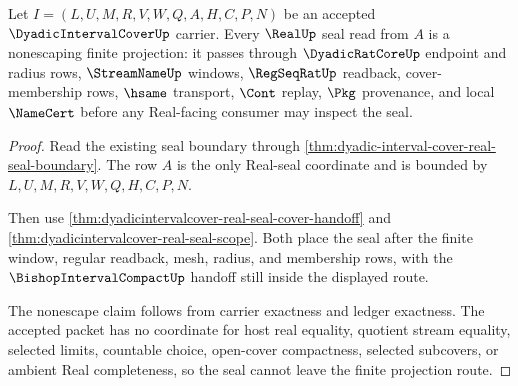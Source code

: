 \begin{theorem}
\label{thm:dyadicintervalcover-real-seal-nonescape-obligation}
Let $I=(L,U,M,R,V,W,Q,A,H,C,P,N)$ be an accepted $\DyadicIntervalCoverUp$ carrier. Every $\RealUp$ seal read from $A$ is a nonescaping finite projection: it passes through $\DyadicRatCoreUp$ endpoint and radius rows, $\StreamNameUp$ windows, $\RegSeqRatUp$ readback, cover-membership rows, $\hsame$ transport, $\Cont$ replay, $\Pkg$ provenance, and local $\NameCert$ before any Real-facing consumer may inspect the seal.
\end{theorem}
\begin{proof}
Read the existing seal boundary through \autoref{thm:dyadic-interval-cover-real-seal-boundary}. The row $A$ is the only Real-seal coordinate and is bounded by $L,U,M,R,V,W,Q,H,C,P,N$.

Then use \autoref{thm:dyadicintervalcover-real-seal-cover-handoff} and \autoref{thm:dyadicintervalcover-real-seal-scope}. Both place the seal after the finite window, regular readback, mesh, radius, and membership rows, with the $\BishopIntervalCompactUp$ handoff still inside the displayed route.

The nonescape claim follows from carrier exactness and ledger exactness. The accepted packet has no coordinate for host real equality, quotient stream equality, selected limits, countable choice, open-cover compactness, selected subcovers, or ambient Real completeness, so the seal cannot leave the finite projection route.
\end{proof}














